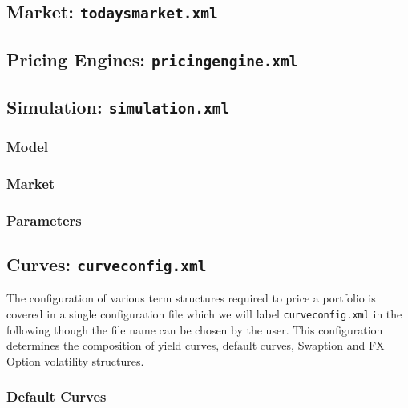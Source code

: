 \documentclass[12pt, a4paper]{article}
\begin{document}
\subsection{Market: {\tt todaysmarket.xml}}\label{sec:market}

\subsection{Pricing Engines: {\tt pricingengine.xml}}

\subsection{Simulation: {\tt simulation.xml}}
\subsubsection{Model}\label{sec:sim_model}
\subsubsection{Market}\label{sec:sim_market}
\subsubsection{Parameters}\label{sec:sim_params}

\subsection{Curves: {\tt curveconfig.xml}}

The configuration of various term structures required to price a portfolio is covered in a single configuration file which we will label {\tt curveconfig.xml} in the following though the file name can be chosen by the user. This configuration determines the composition of yield curves, default curves, Swaption and FX Option volatility structures.
 


\subsubsection{Default Curves}
\end{document}
